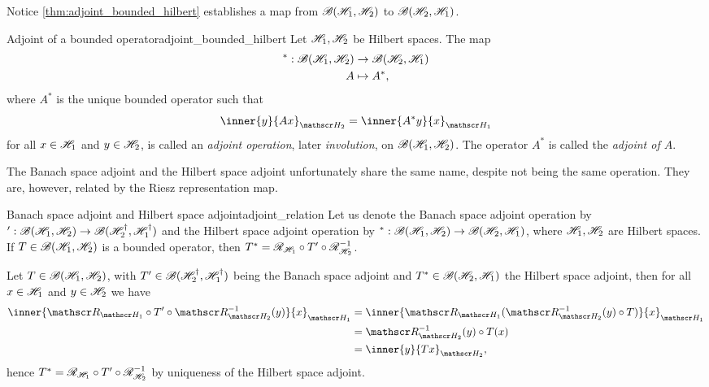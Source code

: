 Notice \cref{thm:adjoint_bounded_hilbert} establishes a map from \(\mathscr{B}(\mathscr{H}_1, \mathscr{H}_2)\) to \(\mathscr{B}(\mathscr{H}_2, \mathscr{H}_1)\).
\begin{definition}{Adjoint of a bounded operator}{adjoint_bounded_hilbert}
    Let \(\mathscr{H}_1, \mathscr{H}_2\) be Hilbert spaces. The map
    \begin{align*}
        ^* : \mathscr{B}(\mathscr{H}_1, \mathscr{H}_2) &\to \mathscr{B}(\mathscr{H}_2, \mathscr{H}_1)\\
                                           A &\mapsto A^*,
    \end{align*}
    where \(A^*\) is the unique bounded operator such that
    \begin{equation*}
        \inner{y}{Ax}_{\hilbert_2} = \inner{A^*y}{x}_{\hilbert_1}
    \end{equation*}
    for all \(x \in \mathscr{H}_1\) and \(y \in \mathscr{H}_2\), is called an \emph{adjoint operation}, later \emph{involution}, on \(\mathscr{B}(\mathscr{H}_1, \mathscr{H}_2)\). The operator \(A^*\) is called the \emph{adjoint of \(A\)}.
\end{definition}
The Banach space adjoint and the Hilbert space adjoint unfortunately share the same name, despite not being the same operation. They are, however, related by the Riesz representation map.

\begin{proposition}{Banach space adjoint and Hilbert space adjoint}{adjoint_relation}
    Let us denote the Banach space adjoint operation by \(' : \mathscr{B}(\mathscr{H}_1, \mathscr{H}_2) \to \mathscr{B}(\mathscr{H}_2^\dag, \mathscr{H}_1^\dag)\) and the Hilbert space adjoint operation by \(^* : \mathscr{B}(\mathscr{H}_1, \mathscr{H}_2) \to \mathscr{B}(\mathscr{H}_2, \mathscr{H}_1)\), where \(\mathscr{H}_1, \mathscr{H}_2\) are Hilbert spaces. If \(T \in \mathscr{B}(\mathscr{H}_1, \mathscr{H}_2)\) is a bounded operator, then \(T^* = \mathscr{R}_{\mathscr{H}_1} \circ T' \circ \mathscr{R}^{-1}_{\mathscr{H}_2}\).
\end{proposition}
Let \(T \in \mathscr{B}(\mathscr{H}_1, \mathscr{H}_2)\), with \(T' \in \mathscr{B}(\mathscr{H}_2^\dag, \mathscr{H}_1^\dag)\) being the Banach space adjoint and \(T^* \in \mathscr{B}(\mathscr{H}_2, \mathscr{H}_1)\) the Hilbert space adjoint, then for all \(x \in \mathscr{H}_1\) and \(y \in \mathscr{H}_2\) we have
    \begin{align*}
        \inner{\riesz_{\hilbert_1} \circ T' \circ \riesz_{\hilbert_2}^{-1}(y)}{x}_{\hilbert_1}
        &= \inner{\riesz_{\hilbert_1}(\riesz_{\hilbert_2}^{-1}(y) \circ T)}{x}_{\hilbert_1}\\
        &= \riesz_{\hilbert_2}^{-1}(y) \circ T(x)\\
        &= \inner{y}{Tx}_{\hilbert_2},
    \end{align*}
    hence \(T^* = \mathscr{R}_{\mathscr{H}_1} \circ T' \circ \mathscr{R}^{-1}_{\mathscr{H}_2}\) by uniqueness of the Hilbert space adjoint.

